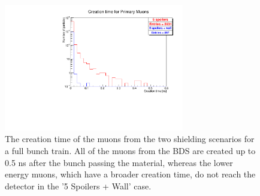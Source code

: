 \begin{figure}
    \centering
    \includegraphics[width=0.7\textwidth]{figures/muon_creationtime.pdf}
    \caption[Creation time of the muons]{
    The creation time of the muons from the two shielding scenarios for a full bunch train.
    All of the muons from the BDS are created up to 0.5 ns after the bunch passing the material, whereas the lower energy muons, which have a broader creation time, do not reach the detector in the ’5 Spoilers + Wall’ case.
    }
    \label{fig:Creation_time}
\end{figure}
